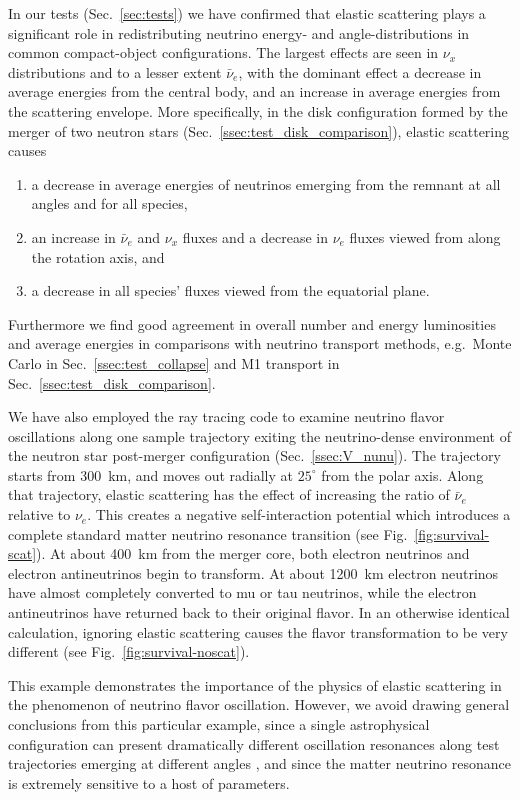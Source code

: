 \documentclass[aps,floatfix,prd,superscriptaddress,twocolumn]{revtex4-1}
\begin{document}
In our tests (Sec.~\ref{sec:tests}) we have confirmed that elastic scattering
plays a significant role in redistributing neutrino energy- and
angle-distributions in common compact-object configurations.
The largest effects are seen in $\nu_x$ distributions
and to a lesser extent $\bar{\nu}_e$,
with the dominant effect a decrease in average energies from the central body,
and an increase in average energies from the scattering envelope.
More specifically, in the disk configuration formed by the merger of two neutron
stars (Sec.~\ref{ssec:test_disk_comparison}), elastic scattering causes
\begin{enumerate}
\item a decrease in average energies of neutrinos emerging from the remnant at
  all angles and for all species,
\item an increase in $\bar{\nu}_e$ and $\nu_x$ fluxes and a decrease in $\nu_e$
  fluxes viewed from along the rotation axis, and
\item a decrease in all species' fluxes viewed from the equatorial plane.
\end{enumerate}
Furthermore we find good agreement in overall number and energy luminosities
and average energies in comparisons with neutrino transport methods,
e.g.\ Monte Carlo in Sec.~\ref{ssec:test_collapse} and
M1 transport in Sec.~\ref{ssec:test_disk_comparison}.

We have also employed the ray tracing code to examine neutrino flavor
oscillations along one sample trajectory exiting the neutrino-dense environment
of the neutron star post-merger configuration (Sec.~\ref{ssec:V_nunu}).
The trajectory starts from 300~km, and moves out radially at
$25^\circ$ from the polar axis.
Along that trajectory, elastic scattering has the effect of increasing
the ratio of $\bar{\nu}_e$ relative to $\nu_e$.
This creates a negative self-interaction potential
which introduces a complete standard matter neutrino resonance transition
(see Fig.~\ref{fig:survival-scat}).
At about 400~km from the merger core,
both electron neutrinos and electron antineutrinos begin to transform.
At about 1200~km
electron neutrinos have almost completely converted to mu or tau neutrinos,
while the electron antineutrinos have returned back to their original flavor.
In an otherwise identical calculation, ignoring elastic scattering
causes the flavor transformation to be very different (see Fig.~\ref{fig:survival-noscat}).

This example demonstrates the importance of the physics of elastic scattering
in the phenomenon of neutrino flavor oscillation.
However, we avoid drawing general conclusions from this particular example,
since a single astrophysical configuration can present dramatically different
oscillation resonances along test trajectories emerging at different angles
\cite{zhu2016-mnr_nsns_remnant},
and since the matter neutrino resonance is extremely sensitive to a host
of parameters.
\end{document}

